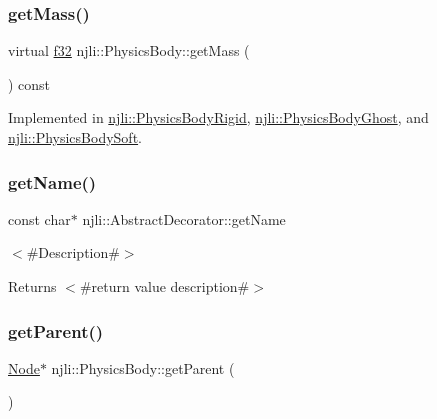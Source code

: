 \subsubsection{\texorpdfstring{get\+Mass()}{getMass()}}
{\footnotesize\ttfamily virtual \mbox{\hyperlink{_util_8h_a5f6906312a689f27d70e9d086649d3fd}{f32}} njli\+::\+Physics\+Body\+::get\+Mass (\begin{DoxyParamCaption}{ }\end{DoxyParamCaption}) const\hspace{0.3cm}{\ttfamily [pure virtual]}}



Implemented in \mbox{\hyperlink{classnjli_1_1_physics_body_rigid_a91e536e02eac21b097654263c6298f1b}{njli\+::\+Physics\+Body\+Rigid}}, \mbox{\hyperlink{classnjli_1_1_physics_body_ghost_ade6ffdabf6c80a9443b2021848872edb}{njli\+::\+Physics\+Body\+Ghost}}, and \mbox{\hyperlink{classnjli_1_1_physics_body_soft_af288891787749f41ddd0097ded18e413}{njli\+::\+Physics\+Body\+Soft}}.

\mbox{\label{classnjli_1_1_physics_body_ad41266885be835f3ee602311e20877a4}} 
\subsubsection{\texorpdfstring{get\+Name()}{getName()}}
{\footnotesize\ttfamily const char$\ast$ njli\+::\+Abstract\+Decorator\+::get\+Name}

$<$\#\+Description\#$>$

\begin{DoxyReturn}{Returns}
$<$\#return value description\#$>$ 
\end{DoxyReturn}
\mbox{\label{classnjli_1_1_physics_body_a9cd56ee4fa9e3258264ae7fa2a5a3a49}} 
\subsubsection{\texorpdfstring{get\+Parent()}{getParent()}\hspace{0.1cm}{\footnotesize\ttfamily [1/2]}}
{\footnotesize\ttfamily \mbox{\hyperlink{classnjli_1_1_node}{Node}}$\ast$ njli\+::\+Physics\+Body\+::get\+Parent (\begin{DoxyParamCaption}{ }\end{DoxyParamCaption})}

